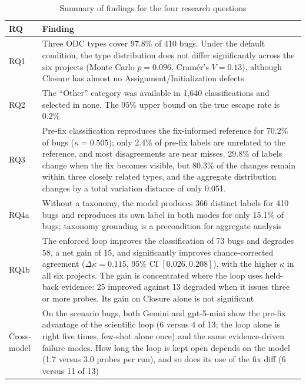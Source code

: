 \documentclass{iutbscthesis}
\begin{document}
\begin{table}[!htbp]
    \centering
    \begin{tabular}{l p{11.2cm}}
        \toprule
        \textbf{RQ} & \textbf{Finding} \\
        \midrule
        RQ1 & Three ODC types cover 97.8\% of 410 bugs. Under the default condition, the type distribution does not differ significantly across the six projects (Monte Carlo $p = 0.096$, Cram\'er's $V = 0.13$), although Closure has almost no Assignment/\allowbreak Initialization defects \\
        \midrule
        RQ2 & The ``Other'' category was available in 1{,}640 classifications and selected in none. The 95\% upper bound on the true escape rate is 0.2\% \\
        \midrule
        RQ3 & Pre-fix classification reproduces the fix-informed reference for 70.2\% of bugs ($\kappa = 0.505$); only 2.4\% of pre-fix labels are unrelated to the reference, and most disagreements are near misses. 29.8\% of labels change when the fix becomes visible, but 80.3\% of the changes remain within three closely related types, and the aggregate distribution changes by a total variation distance of only 0.051. \\
        \midrule
        RQ4a & Without a taxonomy, the model produces 366 distinct labels for 410 bugs and reproduces its own label in both modes for only 15.1\% of bugs; taxonomy grounding is a precondition for aggregate analysis \\
        \midrule
        RQ4b & The enforced loop improves the classification of 73 bugs and degrades 58, a net gain of 15, and significantly improves chance-corrected agreement ($\Delta\kappa = 0.115$, 95\% CI $[0.026, 0.208]$), with the higher $\kappa$ in all six projects. The gain is concentrated where the loop uses held-back evidence: 25 improved against 13 degraded when it issues three or more probes. Its gain on Closure alone is not significant \\
        \midrule
        Cross-model & On the scenario bugs, both Gemini and gpt-5-mini show the pre-fix advantage of the scientific loop (6 versus 4 of 13; the loop alone is right five times, few-shot alone once) and the same evidence-driven failure modes. How long the loop is kept open depends on the model (1.7 versus 3.0 probes per run), and so does its use of the fix diff (6 versus 11 of 13) \\
        \bottomrule
    \end{tabular}
    \caption{Summary of findings for the four research questions}
    \label{tab:summary}
\end{table}
\end{document}
